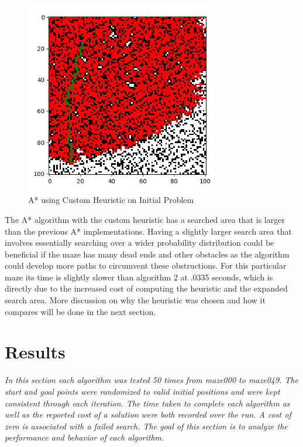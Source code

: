 \documentclass[a4paper]{article}
\begin{document}
\begin{figure}[ht]
    \centering
    \includegraphics[width=0.75\textwidth]{fig6.png}
    \caption{A* using Custom Heuristic on Initial Problem}
    \label{fig:custom}
\end{figure}
The A* algorithm with the custom heuristic has a searched area that is larger than the previous A* implementations. Having a slightly larger search area that involves essentially searching over a wider probability distribution could be beneficial if the maze has many dead ends and other obstacles as the algorithm could develop more paths to circumvent these obstructions. For this particular maze its time is slightly slower than algorithm 2 at .0335 seconds, which is directly due to the increased cost of computing the heuristic and the expanded search area. More discussion on why the heuristic was chosen and how it compares will be done in the next section. 
\newpage

\section*{{Results}}
\textit{In this section each algorithm was tested 50 times from maze000 to maze049. The start and goal points were randomized to valid initial positions and were kept consistent through each iteration. The time taken to complete each algorithm as well as the reported cost of a solution were both recorded over the run. A cost of zero is associated with a failed search. The goal of this section is to analyze the performance and behavior of each algorithm.}
\end{document}
